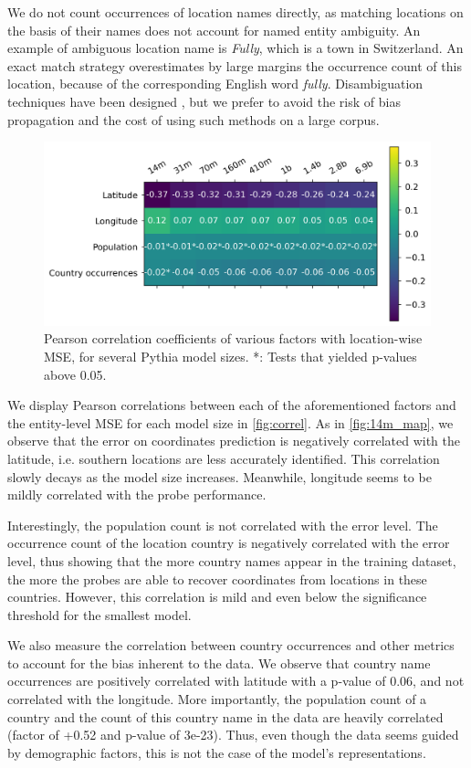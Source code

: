 We do not count occurrences of location names directly, as matching locations on the basis of their names does not account for named entity ambiguity. An example of ambiguous location name is \textit{Fully}, which is a town in Switzerland. An exact match strategy overestimates by large margins the occurrence count of this location, because of the corresponding English word \textit{fully}. Disambiguation techniques have been designed \citep{hoffart-etal-2011-robust, orr2020bootleg}, but we prefer to avoid the risk of bias propagation and the cost of using such methods on a large corpus.

\begin{figure}
    \centering
    \includegraphics[width=0.7\linewidth]{sources/part_1/geographical/imgs/correl_size.png}
    \caption{Pearson correlation coefficients of various factors with location-wise MSE, for several Pythia model sizes. *: Tests that yielded p-values above 0.05.}
    \label{fig:correl}
\end{figure}

We display Pearson correlations between each of the aforementioned factors and the entity-level MSE for each model size in \autoref{fig:correl}. As in \autoref{fig:14m_map}, we observe that the error on coordinates prediction is negatively correlated with the latitude, i.e. southern locations are less accurately identified. This correlation slowly decays as the model size increases. Meanwhile, longitude seems to be mildly correlated with the probe performance.

Interestingly, the population count is not correlated with the error level. The occurrence count of the location country is negatively correlated with the error level, thus showing that the more country names appear in the training dataset, the more the probes are able to recover coordinates from locations in these countries. However, this correlation is mild and even below the significance threshold for the smallest model.

We also measure the correlation between country occurrences and other metrics to account for the bias inherent to the data. We observe that country name occurrences are positively correlated with latitude with a p-value of 0.06, and not correlated with the longitude. More importantly, the population count of a country and the count of this country name in the data are heavily correlated (factor of +0.52 and p-value of 3e-23). Thus, even though the data seems guided by demographic factors, this is not the case of the model's representations.

